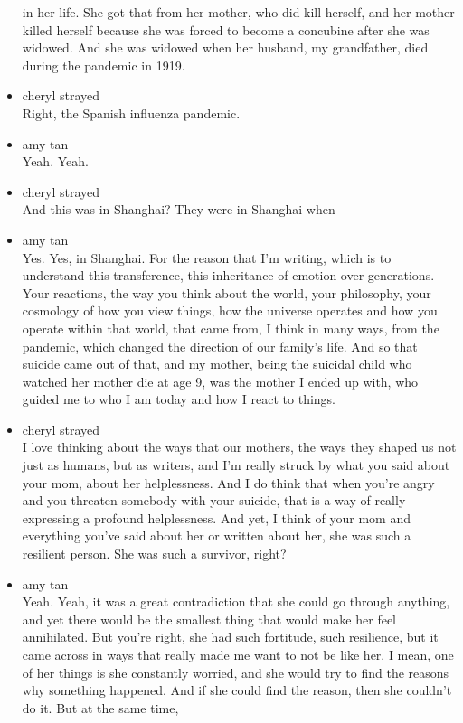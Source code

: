 \begin{itemize}
  in her life. She got that from her mother, who did kill herself, and
  her mother killed herself because she was forced to become a concubine
  after she was widowed. And she was widowed when her husband, my
  grandfather, died during the pandemic in 1919.
\item
  cheryl strayed\\
  Right, the Spanish influenza pandemic.
\item
  amy tan\\
  Yeah. Yeah.
\item
  cheryl strayed\\
  And this was in Shanghai? They were in Shanghai when ---
\item
  amy tan\\
  Yes. Yes, in Shanghai. For the reason that I'm writing, which is to
  understand this transference, this inheritance of emotion over
  generations. Your reactions, the way you think about the world, your
  philosophy, your cosmology of how you view things, how the universe
  operates and how you operate within that world, that came from, I
  think in many ways, from the pandemic, which changed the direction of
  our family's life. And so that suicide came out of that, and my
  mother, being the suicidal child who watched her mother die at age 9,
  was the mother I ended up with, who guided me to who I am today and
  how I react to things.
\item
  cheryl strayed\\
  I love thinking about the ways that our mothers, the ways they shaped
  us not just as humans, but as writers, and I'm really struck by what
  you said about your mom, about her helplessness. And I do think that
  when you're angry and you threaten somebody with your suicide, that is
  a way of really expressing a profound helplessness. And yet, I think
  of your mom and everything you've said about her or written about her,
  she was such a resilient person. She was such a survivor, right?
\item
  amy tan\\
  Yeah. Yeah, it was a great contradiction that she could go through
  anything, and yet there would be the smallest thing that would make
  her feel annihilated. But you're right, she had such fortitude, such
  resilience, but it came across in ways that really made me want to not
  be like her. I mean, one of her things is she constantly worried, and
  she would try to find the reasons why something happened. And if she
  could find the reason, then she couldn't do it. But at the same time,

\end{itemize}
